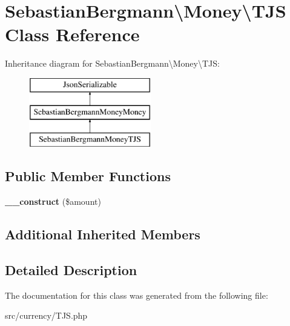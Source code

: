 \hypertarget{classSebastianBergmann_1_1Money_1_1TJS}{}\section{Sebastian\+Bergmann\textbackslash{}Money\textbackslash{}T\+J\+S Class Reference}
\label{classSebastianBergmann_1_1Money_1_1TJS}
Inheritance diagram for Sebastian\+Bergmann\textbackslash{}Money\textbackslash{}T\+J\+S\+:\begin{figure}[H]
\begin{center}
\leavevmode
\includegraphics[height=3.000000cm]{classSebastianBergmann_1_1Money_1_1TJS}
\end{center}
\end{figure}
\subsection*{Public Member Functions}
\begin{DoxyCompactItemize}
\item 
\hypertarget{classSebastianBergmann_1_1Money_1_1TJS_afc817df75e5dc4dc3ea0a6a7e4ebc6c9}{}{\bfseries \+\_\+\+\_\+construct} (\$amount)\label{classSebastianBergmann_1_1Money_1_1TJS_afc817df75e5dc4dc3ea0a6a7e4ebc6c9}

\end{DoxyCompactItemize}
\subsection*{Additional Inherited Members}


\subsection{Detailed Description}


The documentation for this class was generated from the following file\+:\begin{DoxyCompactItemize}
\item 
src/currency/T\+J\+S.\+php\end{DoxyCompactItemize}

